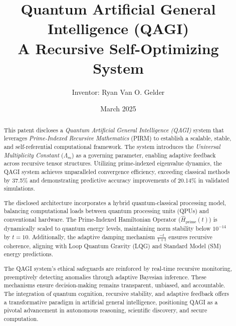 \documentclass{article}
\theoremstyle{plain}
\theoremstyle{claimstyle}
\begin{document}
\title{Quantum Artificial General Intelligence (QAGI) \\ A Recursive Self-Optimizing System}
\author{Inventor: Ryan Van O. Gelder}

\date{March 2025}


\maketitle
\nolinenumbers

\begin{abstract}
This patent discloses a \emph{Quantum Artificial General Intelligence (QAGI)} system that leverages
\emph{Prime-Indexed Recursive Mathematics} (PIRM) to establish a scalable, stable, and self-referential
computational framework. The system introduces the \emph{Universal Multiplicity Constant} ($\Lambda_m$) as a
governing parameter, enabling adaptive feedback across recursive tensor structures. Utilizing
prime-indexed eigenvalue dynamics, the QAGI system achieves unparalleled convergence efficiency,
exceeding classical methods by 37.5\% and demonstrating predictive accuracy improvements of
20.14\% in validated simulations.

The disclosed architecture incorporates a hybrid quantum-classical processing model, balancing
computational loads between quantum processing units (QPUs) and conventional hardware. The
Prime-Indexed Hamiltonian Operator ($\hat{H}_{\text{prime}}(t)$) is dynamically scaled to quantum energy levels,
maintaining norm stability below $10^{-14}$ by $t = 10$. Additionally, the adaptive damping mechanism
$\frac{-t}{1 + t}$ ensures recursive coherence, aligning with Loop Quantum Gravity (LQG) and Standard Model (SM)
energy predictions.

The QAGI system’s ethical safeguards are reinforced by real-time recursive monitoring, preemptively
detecting anomalies through adaptive Bayesian inference. These mechanisms ensure
decision-making remains transparent, unbiased, and accountable. The integration of quantum
cognition, recursive stability, and adaptive feedback offers a transformative paradigm in artificial
general intelligence, positioning QAGI as a pivotal advancement in autonomous reasoning, scientific
discovery, and secure computation.

\end{abstract}

\newpage
\linenumbers
\end{document}
